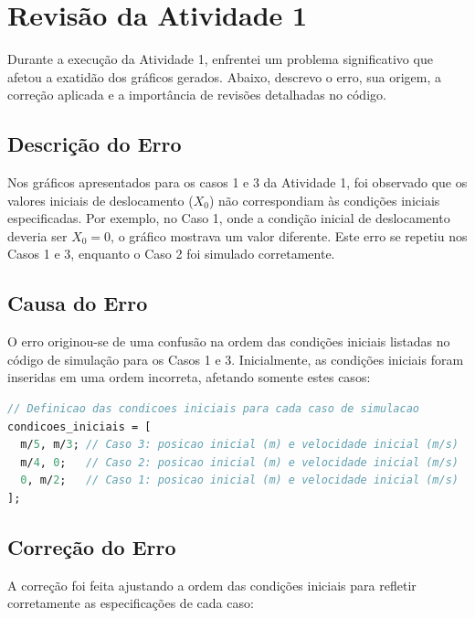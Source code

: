 \documentclass{article}
\begin{document}
\section{Revisão da Atividade 1}

Durante a execução da Atividade 1, enfrentei um problema significativo que afetou a exatidão dos gráficos gerados. Abaixo, descrevo o erro, sua origem, a correção aplicada e a importância de revisões detalhadas no código.

\subsection{Descrição do Erro}

Nos gráficos apresentados para os casos 1 e 3 da Atividade 1, foi observado que os valores iniciais de deslocamento (\(X_0\)) não correspondiam às condições iniciais especificadas. Por exemplo, no Caso 1, onde a condição inicial de deslocamento deveria ser \(X_0 = 0\), o gráfico mostrava um valor diferente. Este erro se repetiu nos Casos 1 e 3, enquanto o Caso 2 foi simulado corretamente.

\subsection{Causa do Erro}

O erro originou-se de uma confusão na ordem das condições iniciais listadas no código de simulação para os Casos 1 e 3. Inicialmente, as condições iniciais foram inseridas em uma ordem incorreta, afetando somente estes casos:

\begin{lstlisting}[language=Scilab, caption=Condições iniciais incorretas]
  // Definicao das condicoes iniciais para cada caso de simulacao
condicoes_iniciais = [
  m/5, m/3; // Caso 3: posicao inicial (m) e velocidade inicial (m/s)
  m/4, 0;   // Caso 2: posicao inicial (m) e velocidade inicial (m/s)
  0, m/2;   // Caso 1: posicao inicial (m) e velocidade inicial (m/s)
];
\end{lstlisting}

\subsection{Correção do Erro}

A correção foi feita ajustando a ordem das condições iniciais para refletir corretamente as especificações de cada caso:
\end{document}

